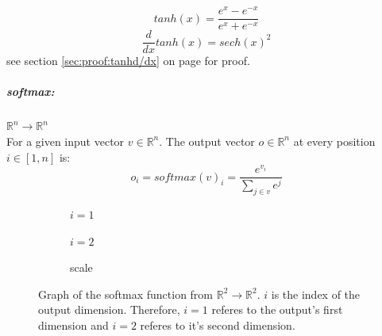 \documentclass[12pt]{article}
\newcommand{\sectionref}[1]{section \ref{#1} on page \pageref{#1}}
\begin{document}
\begin{center}

\end{center}

\begin{equation} \label{eq:NN:tanh}
tanh(x) = \frac{e^x-e^{-x}}{e^x+e^{-x}}
\end{equation}\begin{equation} \label{eq:NN:tanh_derivative}
\frac{d}{dx}tanh(x) = sech(x)^2
\end{equation}
see \sectionref{sec:proof:tanhd/dx} for proof.
\subparagraph*{softmax:} \(\mathbb{R}^n\to \mathbb{R}^n\)\\
\indent For a given input vector \(v \in \mathbb{R}^n\). The output vector \(o \in \mathbb{R}^n\) at every position \(i \in [1, n]\) is:
\begin{equation} \label{eq:NN:softmax}
o_i = softmax(v)_i = \frac{e^{v_i}}{\sum_{j \in v} e^j}
\end{equation}
\begin{figure}[H]
\centering
\begin{subfigure}{.4\textwidth}
  \centering
  
  \caption{\(i=1\)}
  \label{fig:sub1}
\end{subfigure}%
\begin{subfigure}{.4\textwidth}
  \centering
  
  \caption{\(i=2\)}
  \label{fig:sub2}
\end{subfigure}
\begin{subfigure}{.1\textwidth}
  \centering
  
  \caption*{scale}
\end{subfigure}
\caption{Graph of the softmax function from \(\mathbb R^2 \to \mathbb R^2\). \(i\) is the index of the output dimension. Therefore, \(i=1\) referes to the output's first dimension and \(i=2\) referes to it's second dimension.}
\label{fig:test}
\end{figure}
\end{document}
